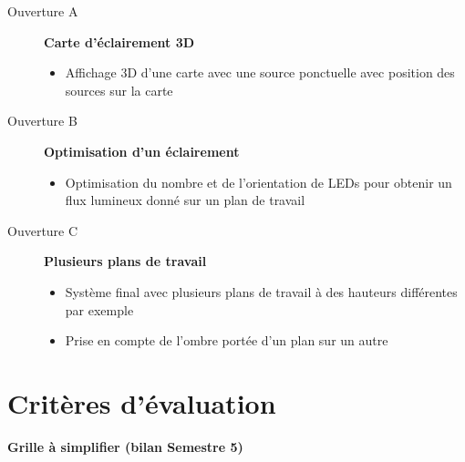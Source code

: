\begin{description}

	\item[Ouverture A] \textbf{Carte d'éclairement 3D}
	
	\begin{itemize}
		\item Affichage 3D d'une carte avec une source ponctuelle avec position des sources sur la carte
	\end{itemize}	

\qquad

	\item[Ouverture B] \textbf{Optimisation d'un éclairement}
	
	\begin{itemize}
		\item Optimisation du nombre et de l'orientation de LEDs pour obtenir un flux lumineux donné sur un plan de travail
	\end{itemize}	

\qquad
	
	\item[Ouverture C] \textbf{Plusieurs plans de travail}
	\begin{itemize}
		\item Système final avec plusieurs plans de travail à des hauteurs différentes par exemple
		\item Prise en compte de l'ombre portée d'un plan sur un autre
	\end{itemize}
	
\end{description}


\section{Critères d'évaluation}

\textbf{Grille à simplifier (bilan Semestre 5)}

